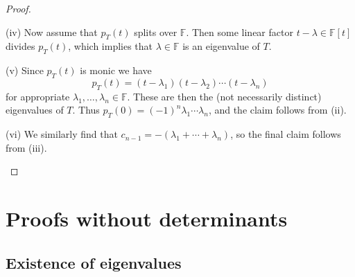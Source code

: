 \documentclass[article, a4paper, 11pt, oneside]{memoir}
\makeatletter
\numberwithin{equation}{chapter}
\DeclareMathOperator{\spec}{Spec}
\newcommand{\mat@dims}[1]{%
    \readlist*\@dims{#1}%
    \ifnum \@dimslen=1
        \def\@dimsout{\@dims[1]}%
    \else
        \def\@dimsout{\@dims[1], \@dims[2]}%
    \fi
    \@dimsout
}
\newcommand{\mat}[2]{\mathrm{Mat}_{\mat@dims{#1}}(#2)}
\newcommand{\field}{\mathbb{F}}
\makeatother
\begin{document}
\begin{proof}
\begin{proofsec}
    \item[(iv)]
    Now assume that $p_T(t)$ splits over $\field$. Then some linear factor $t-\lambda \in \field[t]$ divides $p_T(t)$, which implies that $\lambda \in \field$ is an eigenvalue of $T$.
    
    \item[(v)]
    Since $p_T(t)$ is monic we have
    \begin{equation*}
        p_T(t)
            = (t - \lambda_1) (t - \lambda_2) \cdots (t - \lambda_n)
    \end{equation*}
    for appropriate $\lambda_1, \ldots, \lambda_n \in \field$. These are then the (not necessarily distinct) eigenvalues of $T$. Thus $p_T(0) = (-1)^n \lambda_1 \cdots \lambda_n$, and the claim follows from (ii).

    \item[(vi)]
    We similarly find that $c_{n-1} = -(\lambda_1 + \cdots + \lambda_n)$, so the final claim follows from (iii).
\end{proofsec}
\end{proof}


\section{Proofs without determinants}

\subsection{Existence of eigenvalues}


\end{document}
